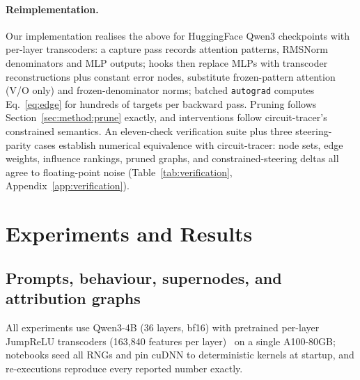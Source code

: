 \documentclass[11pt,a4paper]{article}
\begin{document}
\paragraph{Reimplementation.}
Our implementation realises the above for HuggingFace Qwen3 checkpoints with per-layer
transcoders: a capture pass records attention patterns, RMSNorm denominators and MLP
outputs; hooks then replace MLPs with transcoder reconstructions plus constant error
nodes, substitute frozen-pattern attention (V/O only) and frozen-denominator norms;
batched \texttt{autograd} computes Eq.~\eqref{eq:edge} for hundreds of targets per
backward pass. Pruning follows Section~\ref{sec:method:prune} exactly, and
interventions follow circuit-tracer's constrained semantics. An eleven-check verification
suite plus three steering-parity cases establish numerical equivalence with
circuit-tracer: node sets, edge weights, influence rankings, pruned graphs, and
constrained-steering deltas all agree to floating-point noise
(Table~\ref{tab:verification}, Appendix~\ref{app:verification}).

\section{Experiments and Results}\label{sec:experiments}

\subsection{Prompts, behaviour, supernodes, and attribution graphs}\label{sec:exp:graphs}

All experiments use Qwen3-4B (36 layers, bf16) with pretrained per-layer JumpReLU
transcoders (163{,}840 features per layer)~\citep{hanna2025qwen3tc} on a single
A100-80GB; notebooks seed all RNGs and pin cuDNN to deterministic kernels at startup,
and re-executions reproduce every reported number exactly.
\end{document}
